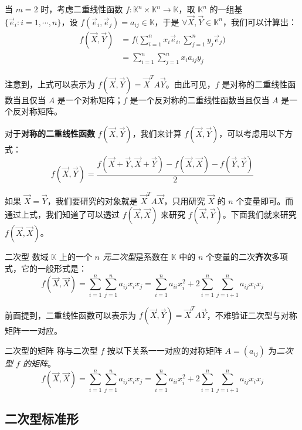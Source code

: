 \bigskip

当 $m = 2$ 时，考虑二重线性函数 $f \colon \mathbb K^n \times \mathbb K^n \to \mathbb K$，取 $\mathbb K^n$ 的一组基 $\{\vec e_i \colon i = 1, \cdots, n\}$，设 $f(\vec e_i, \vec e_j) = a_{ij} \in \mathbb K$，于是 $\forall \vec X, \vec Y \in \mathbb K^n$，我们可以计算出：
$$
\begin{aligned}
f(\vec X, \vec Y) &= f \biggl( \sum_{i = 1}^n x_i \vec e_i, \sum_{j = 1}^n y_j \vec e_j \biggr)
\\&=
\sum_{i = 1}^n \sum_{j = 1}^n x_i a_{ij} y_j
\end{aligned}
$$

注意到，上式可以表示为 $f(\vec X, \vec Y) = \vec X^T A \vec Y$。由此可见，$f$ 是对称的二重线性函数当且仅当 $A$ 是一个对称矩阵；$f$ 是一个反对称的二重线性函数当且仅当 $A$ 是一个反对称矩阵。

\bigskip

对于\textbf{对称的二重线性函数} $f(\vec X, \vec Y)$，我们来计算 $f(\vec X, \vec Y)$，可以考虑用以下方式：
$$
f(\vec X, \vec Y) = \dfrac{f(\vec X + \vec Y, \vec X + \vec Y) - f(\vec X, \vec X) - f(\vec Y, \vec Y)}{2}
$$

如果 $\vec X = \vec Y$，我们要研究的对象就是 $\vec X^T A \vec X$，只用研究 $\vec X$ 的 $n$ 个变量即可。而通过上式，我们知道了可以透过 $f(\vec X, \vec X)$ 来研究 $f(\vec X, \vec Y)$。下面我们就来研究 $f(\vec X, \vec X)$。

\begin{definition}{二次型}
	数域 $\mathbb K$ 上的一个 \emph{$n$ 元二次型}是系数在 $\mathbb K$ 中的 $n$ 个变量的二次\textbf{齐次}多项式，它的一般形式是：
	$$
	f(\vec X, \vec X) = \sum_{i = 1}^n \sum_{j = 1}^n a_{ij} x_i x_j = \sum_{i = 1}^n a_{ii} x_i^2 + 2 \sum_{i = 1}^n \sum_{j = i + 1}^n a_{ij} x_i x_j
	$$
\end{definition}

前面提到，二重线性函数可以表示为 $f(\vec X, \vec Y) = \vec X^T A \vec Y$，不难验证二次型与对称矩阵一一对应。

\begin{definition}{二次型的矩阵}
	称与二次型 $f$ 按以下关系一一对应的对称矩阵 $A = (a_{ij})$ 为\emph{二次型 $f$ 的矩阵}。
	$$
	f(\vec X, \vec X) = \sum_{i = 1}^n \sum_{j = 1}^n a_{ij} x_i x_j = \sum_{i = 1}^n a_{ii} x_i^2 + 2 \sum_{i = 1}^n \sum_{j = i + 1}^n a_{ij} x_i x_j
	$$
\end{definition}

\subsection{二次型标准形}

